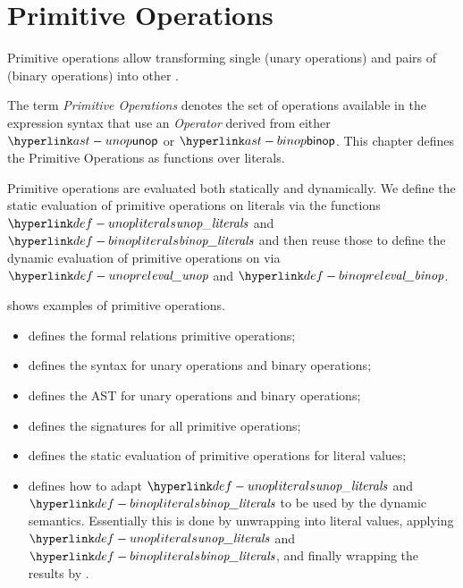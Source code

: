 \chapter{Primitive Operations\label{chap:PrimitiveOperations}}

Primitive operations allow transforming single \nativevaluesterm{} (unary operations)
and pairs of \nativevaluesterm{} (binary operations) into other \nativevaluesterm{}.

The term \emph{Primitive Operations} denotes the set of operations available
in the expression syntax that use an \emph{Operator} derived from either
$\unop$ or $\binop$.
This chapter defines the Primitive Operations as functions over literals.

Primitive operations are evaluated both statically and dynamically.
We define the static evaluation of primitive operations on literals
via the functions $\unopliterals$ and $\binopliterals$ and then reuse
those to define the dynamic evaluation of primitive operations
on \nativevaluesterm{} via $\evalunop$ and $\evalbinop$.

 shows examples of primitive operations.

\ChapterOutline
\begin{itemize}
  \item {} defines the formal relations
        primitive operations;
  \item {} defines the syntax for unary operations and binary operations;
  \item {} defines the AST for unary operations and binary operations;
  \item {} defines the signatures for all primitive operations;
  \item {} defines the static evaluation of primitive operations for literal values;
  \item {} defines how to adapt $\unopliterals$
        and $\binopliterals$ to be used by the dynamic semantics. Essentially this is done by unwrapping
        \nativevaluesterm{} into literal values, applying $\unopliterals$ and $\binopliterals$,
        and finally wrapping the results by \nativevaluesterm{}.
\end{itemize}

